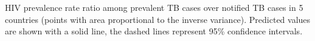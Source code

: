 HIV prevalence rate ratio among prevalent TB cases over notified TB cases in 5 countries (points with area proportional to the inverse variance). Predicted values are shown with a solid line, the dashed lines represent 95\% confidence intervals.